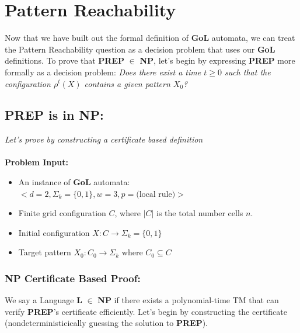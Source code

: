 \documentclass{article}
\theoremstyle{definition}
\theoremstyle{plain}
\theoremstyle{plain}
\begin{document}
\section{Pattern Reachability}
Now that we have built out the formal definition of \textbf{GoL} automata, we can treat the Pattern Reachability question as a decision problem that uses our \textbf{GoL} definitions. To prove that \textbf{PREP} $\in$ \textbf{NP}, let's begin by expressing \textbf{PREP} more formally as a decision problem: \textit{Does there exist a time $t \geq 0$ such that the configuration $\rho^t(X)$ contains a given pattern $X_0$?}

\subsection{PREP is in NP:}

\label{NP_proof}
\textit{Let's prove by constructing a certificate based definition}\\
\\
\textbf{Problem Input:}
\begin{itemize}
  \item An instance of \textbf{GoL} automata: $<d = 2, \Sigma_k = \{0,1\}, w = 3, p = \text{(local rule)}>$
    \item Finite grid configuration $ C$, where $ |C| $ is the total number cells $n$.
  \item Initial configuration $ X: C \to \Sigma_k = \{0,1\}$ 
    \item Target pattern $ X_0: C_0 \to \Sigma_k $ where \( C_0 \subseteq C \)
\end{itemize}

\subsubsection{NP Certificate Based Proof:\cite{SUTNER199587}}
We say a  Language \textbf{L} $\in$ \textbf{NP} if there exists a polynomial-time TM that can verify \textbf{PREP}'s certificate efficiently. Let's begin by constructing the certificate (nondeterministicically guessing the solution to \textbf{PREP}).
\end{document}
